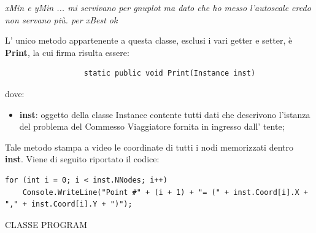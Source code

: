 \documentclass[11pt]{article}
\begin{document}
\textit{xMin e yMin ... mi servivano per gnuplot ma dato che ho messo l'autoscale credo non servano più. per xBest ok}

L' unico metodo appartenente a questa classe, esclusi i vari getter e setter, è \textbf{Print}, la cui firma risulta essere:

\begin{lstlisting}
                  static public void Print(Instance inst)
\end{lstlisting}

dove:

\begin{itemize}
\item \textbf{inst}: oggetto della classe Instance contente tutti dati che descrivono l'istanza del problema del Commesso Viaggiatore fornita in ingresso dall' tente;
\end{itemize}

Tale metodo stampa a video le coordinate di tutti i nodi memorizzati dentro \textbf{inst}. Viene di seguito riportato il codice:

\begin{lstlisting}
for (int i = 0; i < inst.NNodes; i++)
    Console.WriteLine("Point #" + (i + 1) + "= (" + inst.Coord[i].X + "," + inst.Coord[i].Y + ")");
\end{lstlisting}

\vspace{2\baselineskip}

CLASSE PROGRAM

\vspace{2\baselineskip}
\end{document}
